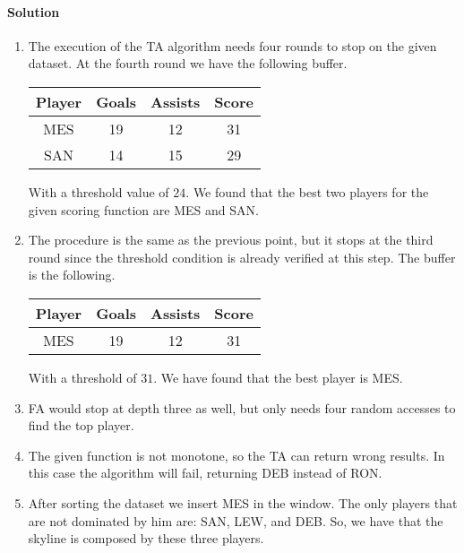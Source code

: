 \paragraph*{Solution}
\begin{enumerate}
    \item The execution of the TA algorithm needs four rounds to stop on the given dataset. 
        At the fourth round we have the following buffer. 
        \begin{table}[H]
            \centering
            \begin{tabular}{c|cc|c}
            \hline
            \textbf{Player} & \textbf{Goals} & \textbf{Assists} & \textbf{Score} \\ \hline
            MES             & 19             & 12               & 31             \\
            SAN             & 14             & 15               & 29             \\ \hline
            \end{tabular}
        \end{table}
        With a threshold value of $24$. We found that the best two players for the given scoring function are MES and SAN. 
    \item The procedure is the same as the previous point, but it stops at the third round since the threshold condition is already verified at this step. The buffer is the following.
        \begin{table}[H]
            \centering
            \begin{tabular}{c|cc|c}
            \hline
            \textbf{Player} & \textbf{Goals} & \textbf{Assists} & \textbf{Score} \\ \hline
            MES             & 19             & 12               & 31             \\ \hline
            \end{tabular}
        \end{table}
        With a threshold of $31$. We have found that the best player is MES. 
    \item FA would stop at depth three as well, but only needs four random accesses to find the top player. 
    \item The given function is not monotone, so the TA can return wrong results. 
        In this case the algorithm will fail, returning DEB instead of RON. 
    \item After sorting the dataset we insert MES in the window. 
        The only players that are not dominated by him are: SAN, LEW, and DEB. 
        So, we have that the skyline is composed by these three players. 
\end{enumerate}